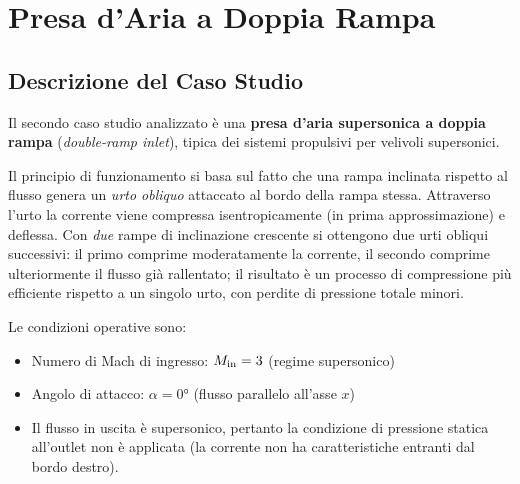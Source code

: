 \chapter{Presa d'Aria a Doppia Rampa}
\label{cap:doppia_presa}

\section{Descrizione del Caso Studio}
\label{sec:presa_descrizione}

Il secondo caso studio analizzato è una \textbf{presa d'aria supersonica a doppia rampa} (\textit{double-ramp inlet}), tipica dei sistemi propulsivi per velivoli supersonici.

Il principio di funzionamento si basa sul fatto che una rampa inclinata rispetto al flusso
genera un \emph{urto obliquo} attaccato al bordo della rampa stessa. Attraverso l'urto la
corrente viene compressa isentropicamente (in prima approssimazione) e deflessa.
Con \emph{due} rampe di inclinazione crescente si ottengono due urti obliqui successivi:
il primo comprime moderatamente la corrente, il secondo comprime ulteriormente il flusso già
rallentato; il risultato è un processo di compressione più efficiente rispetto a un singolo
urto, con perdite di pressione totale minori.

Le condizioni operative sono:
\begin{itemize}
  \item Numero di Mach di ingresso: $M_{\rm in} = 3$ (regime supersonico)
  \item Angolo di attacco: $\alpha = 0°$ (flusso parallelo all'asse $x$)
  \item Il flusso in uscita è supersonico, pertanto la condizione di pressione statica
    all'outlet non è applicata (la corrente non ha caratteristiche entranti dal bordo destro).
\end{itemize}

